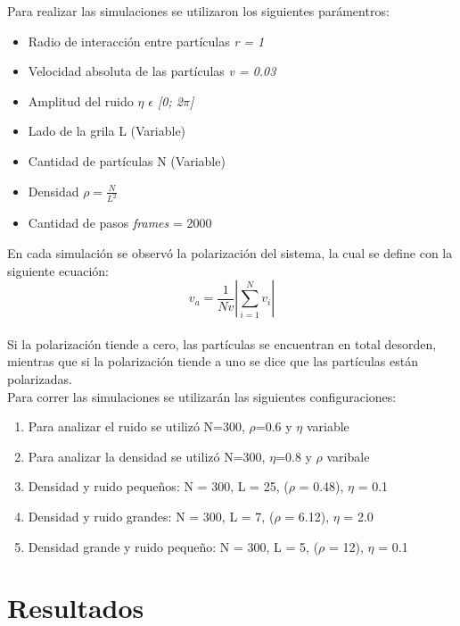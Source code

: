 \documentclass[12pt, a4paper]{report}
\begin{document}
\pagebreak
Para realizar las simulaciones se utilizaron los siguientes parámentros: 
\begin{itemize}
    \item Radio de interacción entre partículas \emph{r = 1}
    \item Velocidad absoluta de las partículas \emph{v = 0.03}
    \item Amplitud del ruido \emph{$\eta$ $\epsilon$ [0; 2$\pi$]} 
    \item Lado de la grila L (Variable) 
    \item Cantidad de partículas N (Variable)
    \item Densidad $\rho = \frac{N}{L^2}$
    \item Cantidad de pasos \emph{frames} = 2000  
\end{itemize}

En cada simulación se observó la polarización del sistema, la cual se define con la siguiente ecuación: 
\begin{equation}
    \label{eq:polarization}
     v_a = \frac{1}{Nv} \left\lvert \sum_{i = 1}^{N} v_i \right\rvert
\end{equation}\\

Si la polarización tiende a cero, las partículas se encuentran en total desorden, mientras que si la polarización tiende a uno se dice que las partículas están polarizadas.\\

Para correr las simulaciones se utilizarán las siguientes configuraciones: 
\begin{enumerate}
    \item Para analizar el ruido se utilizó N=300, $\rho$=0.6 y $\eta$ variable
    \item Para analizar la densidad se utilizó N=300, $\eta$=0.8 y $\rho$ varibale 
    \item Densidad y ruido pequeños:  N = 300, L = 25, ($\rho$ = 0.48), $\eta$ = 0.1
    \item Densidad y ruido grandes:  N = 300, L = 7, ($\rho$ = 6.12), $\eta$ = 2.0  
    \item Densidad grande y ruido pequeño: N = 300,	L = 5, ($\rho$ = 12), $\eta$ = 0.1
\end{enumerate}


\section{Resultados}
\end{document}
